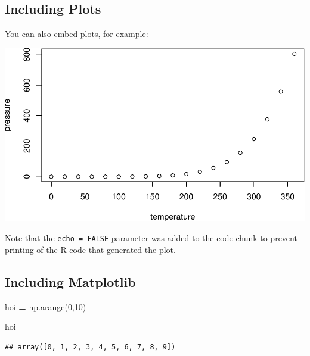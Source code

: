 \documentclass[
]{article}
\newenvironment{Shaded}{\begin{snugshade}}{\end{snugshade}}
\newcommand{\DecValTok}[1]{\textcolor[rgb]{0.00,0.00,0.81}{#1}}
\newcommand{\NormalTok}[1]{#1}
\newcommand{\OperatorTok}[1]{\textcolor[rgb]{0.81,0.36,0.00}{\textbf{#1}}}
\begin{document}
\hypertarget{including-plots}{%
\subsection{Including Plots}\label{including-plots}}

You can also embed plots, for example:

\includegraphics{assignment_1_files/figure-latex/pressure-1.pdf}

Note that the \texttt{echo\ =\ FALSE} parameter was added to the code
chunk to prevent printing of the R code that generated the plot.

\hypertarget{including-matplotlib}{%
\subsection{Including Matplotlib}\label{including-matplotlib}}

\begin{Shaded}
\begin{Highlighting}[]
\NormalTok{hoi }\OperatorTok{=}\NormalTok{ np.arange(}\DecValTok{0}\NormalTok{,}\DecValTok{10}\NormalTok{)}

\NormalTok{hoi}
\end{Highlighting}
\end{Shaded}

\begin{verbatim}
## array([0, 1, 2, 3, 4, 5, 6, 7, 8, 9])
\end{verbatim}

\begin{Shaded}
\end{Shaded}
\end{document}

